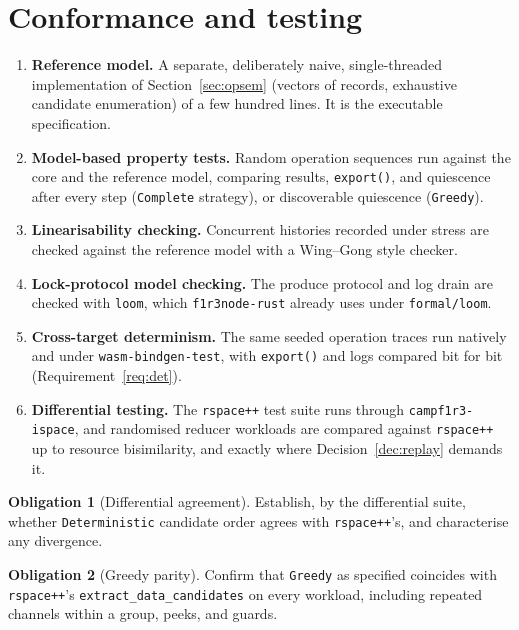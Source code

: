 \documentclass[11pt]{article}
\theoremstyle{plain}
\theoremstyle{definition}
\newtheorem{obligation}{Obligation}
\newcommand{\code}[1]{\texttt{#1}}
\begin{document}
\section{Conformance and testing}\label{sec:testing}

\begin{enumerate}[nosep]
\item \textbf{Reference model.} A separate, deliberately naive, single-threaded
      implementation of Section~\ref{sec:opsem} (vectors of records, exhaustive
      candidate enumeration) of a few hundred lines. It is the executable
      specification.
\item \textbf{Model-based property tests.} Random operation sequences run against
      the core and the reference model, comparing results, \code{export()}, and
      quiescence after every step (\code{Complete} strategy), or discoverable
      quiescence (\code{Greedy}).
\item \textbf{Linearisability checking.} Concurrent histories recorded under stress
      are checked against the reference model with a Wing--Gong style checker.
\item \textbf{Lock-protocol model checking.} The produce protocol and log drain are
      checked with \code{loom}, which \code{f1r3node-rust} already uses under
      \code{formal/loom}.
\item \textbf{Cross-target determinism.} The same seeded operation traces run
      natively and under \code{wasm-bindgen-test}, with \code{export()} and logs
      compared bit for bit (Requirement~\ref{req:det}).
\item \textbf{Differential testing.} The \code{rspace++} test suite runs through
      \code{campf1r3-ispace}, and randomised reducer workloads are compared against
      \code{rspace++} up to resource bisimilarity, and exactly where
      Decision~\ref{dec:replay} demands it.
\end{enumerate}

\begin{obligation}[Differential agreement]\label{ob:diff}
Establish, by the differential suite, whether \code{Deterministic} candidate order
agrees with \code{rspace++}'s, and characterise any divergence.
\end{obligation}

\begin{obligation}[Greedy parity]
Confirm that \code{Greedy} as specified coincides with \code{rspace++}'s
\code{extract\_data\_candidates} on every workload, including repeated channels
within a group, peeks, and guards.
\end{obligation}
\end{document}
